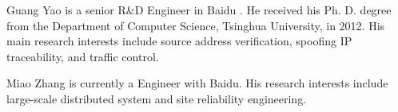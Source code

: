 \documentclass[10pt,journal,compsoc]{IEEEtran}
\begin{document}
\begin{IEEEbiography}
{Guang Yao} is a senior R\&D Engineer in Baidu . He received his Ph. D. degree from the Department of Computer Science, Tsinghua University, in 2012. His main research interests include source address verification, spoofing IP traceability, and traffic control.
\end{IEEEbiography}

\begin{IEEEbiographynophoto}
{Miao Zhang} is currently a Engineer with Baidu. His research interests include large-scale distributed system and site reliability engineering.
\end{IEEEbiographynophoto}
\end{document}
